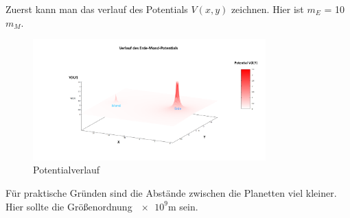 \documentclass{subfiles}
\begin{document}
    Zuerst kann man das verlauf des Potentials $V(x,y)$ zeichnen. Hier ist $m_{E}$ = 10 \cdot $m_{M}$.
    \begin{figure}[H]
        \centering
        \includegraphics[width=0.8\textwidth]{../Ressource/PotentialVerlauf.png}
        \caption{Potentialverlauf}
        \label{fig:Potential}
    \end{figure}
    Für praktische Gründen sind die Abstände zwischen die Planetten viel kleiner. Hier sollte die Größenordnung $\num{e9}$m sein.\\
\end{document}
